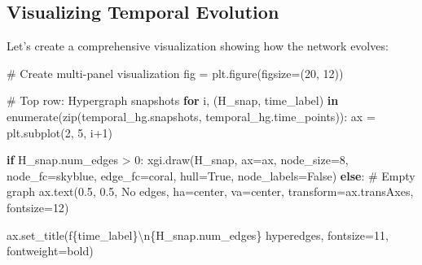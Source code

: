 \documentclass[
  11pt,
  letterpaper,
  oneside,
  openany]{book}
\newenvironment{Shaded}{\begin{snugshade}}{\end{snugshade}}
\newcommand{\BuiltInTok}[1]{\textcolor[rgb]{0.00,0.23,0.31}{#1}}
\newcommand{\CharTok}[1]{\textcolor[rgb]{0.13,0.47,0.30}{#1}}
\newcommand{\CommentTok}[1]{\textcolor[rgb]{0.37,0.37,0.37}{#1}}
\newcommand{\ControlFlowTok}[1]{\textcolor[rgb]{0.00,0.23,0.31}{\textbf{#1}}}
\newcommand{\DecValTok}[1]{\textcolor[rgb]{0.68,0.00,0.00}{#1}}
\newcommand{\FloatTok}[1]{\textcolor[rgb]{0.68,0.00,0.00}{#1}}
\newcommand{\KeywordTok}[1]{\textcolor[rgb]{0.00,0.23,0.31}{\textbf{#1}}}
\newcommand{\NormalTok}[1]{\textcolor[rgb]{0.00,0.23,0.31}{#1}}
\newcommand{\OperatorTok}[1]{\textcolor[rgb]{0.37,0.37,0.37}{#1}}
\newcommand{\SpecialCharTok}[1]{\textcolor[rgb]{0.37,0.37,0.37}{#1}}
\newcommand{\SpecialStringTok}[1]{\textcolor[rgb]{0.13,0.47,0.30}{#1}}
\newcommand{\StringTok}[1]{\textcolor[rgb]{0.13,0.47,0.30}{#1}}
\newcommand{\VariableTok}[1]{\textcolor[rgb]{0.07,0.07,0.07}{#1}}
\begin{document}
\subsection{Visualizing Temporal
Evolution}\label{visualizing-temporal-evolution}

Let's create a comprehensive visualization showing how the network
evolves:

\begin{Shaded}
\begin{Highlighting}[]
\CommentTok{\# Create multi{-}panel visualization}
\NormalTok{fig }\OperatorTok{=}\NormalTok{ plt.figure(figsize}\OperatorTok{=}\NormalTok{(}\DecValTok{20}\NormalTok{, }\DecValTok{12}\NormalTok{))}

\CommentTok{\# Top row: Hypergraph snapshots}
\ControlFlowTok{for}\NormalTok{ i, (H\_snap, time\_label) }\KeywordTok{in} \BuiltInTok{enumerate}\NormalTok{(}\BuiltInTok{zip}\NormalTok{(temporal\_hg.snapshots, temporal\_hg.time\_points)):}
\NormalTok{    ax }\OperatorTok{=}\NormalTok{ plt.subplot(}\DecValTok{2}\NormalTok{, }\DecValTok{5}\NormalTok{, i}\OperatorTok{+}\DecValTok{1}\NormalTok{)}
    
    \ControlFlowTok{if}\NormalTok{ H\_snap.num\_edges }\OperatorTok{\textgreater{}} \DecValTok{0}\NormalTok{:}
\NormalTok{        xgi.draw(H\_snap, ax}\OperatorTok{=}\NormalTok{ax, node\_size}\OperatorTok{=}\DecValTok{8}\NormalTok{, node\_fc}\OperatorTok{=}\StringTok{\textquotesingle{}skyblue\textquotesingle{}}\NormalTok{,}
\NormalTok{                edge\_fc}\OperatorTok{=}\StringTok{\textquotesingle{}coral\textquotesingle{}}\NormalTok{, hull}\OperatorTok{=}\VariableTok{True}\NormalTok{, node\_labels}\OperatorTok{=}\VariableTok{False}\NormalTok{)}
    \ControlFlowTok{else}\NormalTok{:}
        \CommentTok{\# Empty graph}
\NormalTok{        ax.text(}\FloatTok{0.5}\NormalTok{, }\FloatTok{0.5}\NormalTok{, }\StringTok{\textquotesingle{}No edges\textquotesingle{}}\NormalTok{, ha}\OperatorTok{=}\StringTok{\textquotesingle{}center\textquotesingle{}}\NormalTok{, va}\OperatorTok{=}\StringTok{\textquotesingle{}center\textquotesingle{}}\NormalTok{,}
\NormalTok{               transform}\OperatorTok{=}\NormalTok{ax.transAxes, fontsize}\OperatorTok{=}\DecValTok{12}\NormalTok{)}
    
\NormalTok{    ax.set\_title(}\SpecialStringTok{f\textquotesingle{}}\SpecialCharTok{\{}\NormalTok{time\_label}\SpecialCharTok{\}}\CharTok{\textbackslash{}n}\SpecialCharTok{\{}\NormalTok{H\_snap}\SpecialCharTok{.}\NormalTok{num\_edges}\SpecialCharTok{\}}\SpecialStringTok{ hyperedges\textquotesingle{}}\NormalTok{, }
\NormalTok{                fontsize}\OperatorTok{=}\DecValTok{11}\NormalTok{, fontweight}\OperatorTok{=}\StringTok{\textquotesingle{}bold\textquotesingle{}}\NormalTok{)}


\end{Highlighting}
\end{Shaded}
\end{document}
